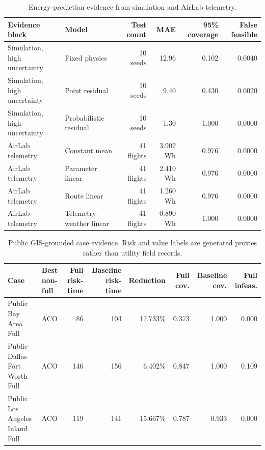 \begin{table}[t]
\centering
\caption{Energy-prediction evidence from simulation and AirLab telemetry.}
\label{tab:energy-evidence}
\footnotesize
\begin{tabular}{@{}llrrrr@{}}
\toprule
Evidence block & Model & Test count & MAE & 95\% coverage & False feasible \\
\midrule
Simulation, high uncertainty & Fixed physics & 10 seeds & 12.96 & 0.102 & 0.0040 \\
Simulation, high uncertainty & Point residual & 10 seeds & 9.40 & 0.430 & 0.0020 \\
Simulation, high uncertainty & Probabilistic residual & 10 seeds & 1.30 & 1.000 & 0.0000 \\
AirLab telemetry & Constant mean & 41 flights & 3.902 Wh & 0.976 & 0.0000 \\
AirLab telemetry & Parameter linear & 41 flights & 2.410 Wh & 0.976 & 0.0000 \\
AirLab telemetry & Route linear & 41 flights & 1.260 Wh & 0.976 & 0.0000 \\
AirLab telemetry & Telemetry-weather linear & 41 flights & 0.890 Wh & 1.000 & 0.0000 \\
\bottomrule
\end{tabular}
\end{table}

\begin{table}[t]
\centering
\caption{Public GIS-grounded case evidence. Risk and value labels are generated proxies rather than utility field records.}
\label{tab:gis-results}
\footnotesize
\begin{tabular}{@{}llrrrrrr@{}}
\toprule
Case & Best non-full & Full risk-time & Baseline risk-time & Reduction & Full cov. & Baseline cov. & Full infeas. \\
\midrule
Public Bay Area Full & ACO & 86 & 104 & 17.733\% & 0.373 & 1.000 & 0.000 \\
Public Dallas Fort Worth Full & ACO & 146 & 156 & 6.402\% & 0.847 & 1.000 & 0.109 \\
Public Los Angeles Inland Full & ACO & 119 & 141 & 15.667\% & 0.787 & 0.933 & 0.000 \\
\bottomrule
\end{tabular}
\end{table}

